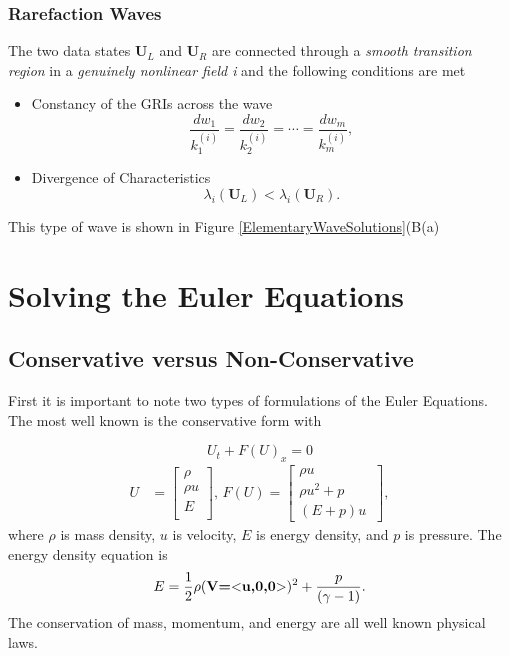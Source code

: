 \documentclass[]{article}
\begin{document}
		\subsubsection{Rarefaction Waves}
			The two data states $ \textbf{U}_L $ and $ \textbf{U}_R $ are connected through a \textit{smooth transition region} in a \textit{genuinely nonlinear field i} and the following conditions are met
			\begin{itemize}
				\item Constancy of the GRIs across the wave
				\begin{equation}
					\frac{dw_1}{k_1^{(i)}} = \frac{dw_2}{k_2^{(i)}} = \cdots = \frac{dw_m}{k_m^{(i)}},
				\end{equation}
				\item Divergence of Characteristics
				\begin{equation}
					\lambda_i(\textbf{U}_L) <  \lambda_i(\textbf{U}_R).
				\end{equation}
			\end{itemize}
			This type of wave is shown in Figure \ref{ElementaryWaveSolutions}(B(a)
		
\section{Solving the Euler Equations}
	
	\subsection{Conservative versus Non-Conservative}
		First it is important to note two types of formulations of the Euler Equations. The most well known is the conservative form with
		
		\begin{equation}
			U_t + F(U)_x = 0
		\end{equation}
		\begin{align}
			U &= \begin{bmatrix}
			\rho \\
			\rho u \\
			E \\
			\end{bmatrix} \mbox{,  } 
			F(U) = \begin{bmatrix}
			\rho u \\
			\rho u^2 + p \\
			(E+p) u\
			\end{bmatrix},
			\label{EulerEquations}
		\end{align}
		where $ \rho $ is mass density, $ u $ is velocity, $ E $ is energy density, and $ p $ is pressure. The energy density equation is
		\begin{equation}
			E = \frac{1}{2}\rho(\textbf{V=$ < $u,0,0$ > $})^2 + \frac{p}{(\gamma -1)}.
		\end{equation}
		The conservation of mass, momentum, and energy are all well known physical laws. 
		
\end{document}
